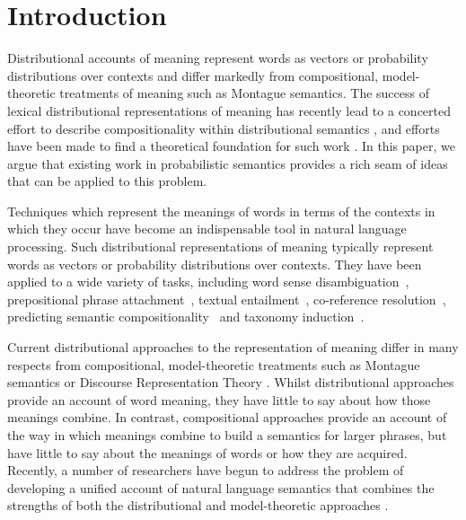 \documentclass[11pt]{article}
\theoremstyle{definition}
\begin{document}
\section{Introduction}

Distributional accounts of meaning represent words as vectors or
probability distributions over contexts and differ markedly from
compositional, model-theoretic treatments of meaning such as Montague
semantics. The success of lexical distributional representations of
meaning has recently lead to a concerted effort to describe
compositionality within distributional semantics
\cite{Widdows:08,Mitchell:08,Baroni2010,Garrette:11,Grefenstette:11,Socher:12,Lewis:13},
and efforts have been made to find a theoretical foundation for such
work \cite{Clarke:12,Kartsaklis:14}. In this paper, we argue that
existing work in probabilistic semantics
\cite{Gaifman:64,Nilsson:86,Sato:95} provides a rich seam of ideas
that can be applied to this problem.

Techniques which represent the meanings of words in terms of the contexts in
which they occur have become an indispensable tool in natural language
processing. Such distributional representations of meaning typically
represent words as vectors or probability distributions over
contexts. They have been applied to a wide variety of tasks, including word sense disambiguation~\cite{miller-EtAl:2012:PAPERS,khapra-EtAl:2010:ACL}, prepositional phrase attachment~\cite{Calvo05distributionalthesaurus}, textual entailment~\cite{berant-dagan-goldberger:2010:ACL}, co-reference resolution~\cite{lee-EtAl:2012:EMNLP-CoNLL}, predicting semantic compositionality~\cite{bergsma-EtAl:2010:EMNLP} and taxonomy induction~\cite{fountain-lapata:2012:NAACL-HLT}.

Current distributional approaches to the representation of meaning
differ in many respects from compositional, model-theoretic treatments
such as Montague semantics or Discourse Representation Theory
\cite{Blackburn:05}. Whilst distributional approaches provide an
account of word meaning, they have little to say about how those meanings
combine. In contrast, compositional approaches provide an account of the way in
which meanings combine to build a semantics for larger phrases, but
have little to say about the meanings of words or how they are
acquired. Recently, a number of researchers have begun to address the
problem of developing a unified account of natural language semantics
that combines the strengths of both the distributional and
model-theoretic approaches
\cite{Clarke:07,Coecke:10,Garrette:11,Lewis:13}. 
\end{document}
